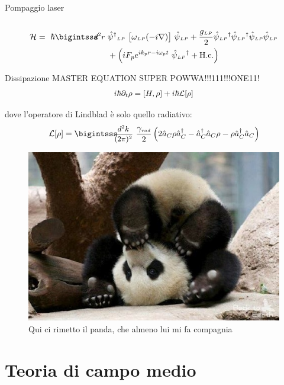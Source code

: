\documentclass[10pt]{beamer}
\begin{document}
\begin{frame}{Pompaggio laser}
{\begin{columns}
\end{columns}
}
\normalsize
\begin{align*}
  \ham = \ \hbar \intr & \opsi^\dagger\lp \ \big[ \omega\lp(-i\nabla) \big]\ \opsi\lp + \frac{g\lp}{2} \opsi\lp^\dagger  \opsi\lp^\dagger  \opsi\lp  \opsi\lp \\
	&+ \left( i F_p e^{ik_p r -i\omega_p t} \ \opsi\lp^\dagger + \hc \right)
\end{align*}





\end{frame}


\begin{frame}{Dissipazione}
MASTER EQUATION \alert{SUPER POWWA}!!!111!!!ONE11!
\begin{equation*}
i\hbar \partial_t\rho = [H,\rho] + i\hbar \mathcal{L}[\rho]
\end{equation*}

dove l'operatore di Lindblad è solo quello radiativo:
\begin{equation*}
\lind \rho = \intk \frac{\gamma_{{\scriptscriptstyle rad}}}{2} \left ( 2\oa_C\rho \oa_C^\dagger - \oa_C^\dagger \oa_C \rho - \rho \oa_C^\dagger \oa_C \right )
\end{equation*}

\begin{figure}
       \includegraphics[scale=.3]{files/Panda.jpg}
       \caption{\footnotesize Qui ci rimetto il panda, che almeno lui mi fa compagnia}
      \end{figure}
 
\end{frame}


\section{Teoria di campo medio}
\end{document}
